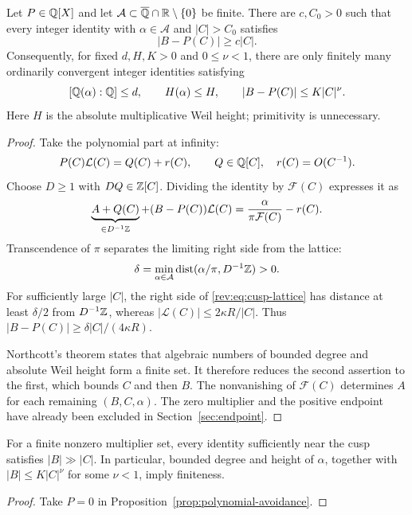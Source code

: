 \begin{proposition}\label{prop:polynomial-avoidance}
Let $P\in\mathbb Q[X]$ and let
$\mathcal A\subset\overline{\mathbb Q}\cap\mathbb R\setminus\{0\}$ be finite.
There are $c,C_0>0$ such that every integer identity with
$\alpha\in\mathcal A$ and $|C|>C_0$ satisfies
\[
                         |B-P(C)|\ge c|C|.
\]
Consequently, for fixed $d,H,K>0$ and $0\le\nu<1$, there are only
finitely many ordinarily convergent integer identities satisfying
\[
 [\mathbb Q(\alpha):\mathbb Q]\le d,\qquad H(\alpha)\le H,\qquad
 |B-P(C)|\le K|C|^\nu.
\]
Here $H$ is the absolute multiplicative Weil height; primitivity is
unnecessary.
\end{proposition}
\begin{proof}
Take the polynomial part at infinity:
\[
 P(C)\mathcal L(C)=Q(C)+r(C),\qquad
 Q\in\mathbb Q[C],\quad r(C)=O(C^{-1}).
\]
Choose $D\ge1$ with $DQ\in\mathbb Z[C]$. Dividing the identity by
$\mathcal F(C)$ expresses it as
\begin{equation}\label{rev:eq:cusp-lattice}
 \underbrace{A+Q(C)}_{\in D^{-1}\mathbb Z}
 +(B-P(C))\mathcal L(C)
       =\frac{\alpha}{\pi\mathcal F(C)}-r(C).
\end{equation}
Transcendence of $\pi$ separates the limiting right side from the
lattice:
\[
 \delta=\min_{\alpha\in\mathcal A}
       \operatorname{dist}(\alpha/\pi,D^{-1}\mathbb Z)>0.
\]
For sufficiently large $|C|$, the right side of
\eqref{rev:eq:cusp-lattice} has distance at least $\delta/2$ from
$D^{-1}\mathbb Z$, whereas $|\mathcal L(C)|\le2\kappa R/|C|$.
Thus $|B-P(C)|\ge\delta|C|/(4\kappa R)$.

Northcott's theorem states that algebraic numbers of bounded degree
and absolute Weil height form a finite set. It therefore reduces the
second assertion to the first, which bounds $C$ and then $B$.
The nonvanishing of $\mathcal F(C)$ determines $A$ for each remaining
$(B,C,\alpha)$. The zero multiplier and the positive endpoint have
already been excluded in Section~\ref{sec:endpoint}.
\end{proof}

\begin{corollary}\label{prop:cusp-finiteness}
For a finite nonzero multiplier set, every identity sufficiently near
the cusp satisfies $|B|\gg|C|$. In particular, bounded degree and height
of $\alpha$, together with $|B|\le K|C|^\nu$ for some $\nu<1$, imply
finiteness.
\end{corollary}
\begin{proof}
Take $P=0$ in Proposition~\ref{prop:polynomial-avoidance}.
\end{proof}

